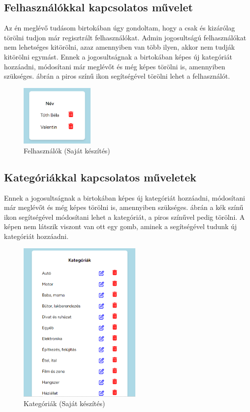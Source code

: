 \documentclass[]{thesis-ekf}
\theoremstyle{definition}
\theoremstyle{remark}
\begin{document}
	\subsection{Felhasználókkal kapcsolatos művelet}
	Az én meglévő tudásom birtokában úgy gondoltam, hogy a csak és kizárólag törölni tudjon már regisztrált felhasználókat. Admin jogosultságú felhasználókat nem lehetséges kitörölni, azaz amennyiben van több ilyen, akkor nem tudják kitörölni egymást. Ennek a jogosultságnak a birtokában képes új kategóriát hozzáadni, módosítani már meglévőt és még képes törölni is, amennyiben szükséges.  ábrán a piros színű ikon segítségével törölni lehet a felhasználót.
	\begin{figure}[ht!]
		\centering
		\includegraphics[height=3cm]{./felhasznaloi/felhasznalo}
		\caption{Felhasználók (Saját készítés)} 
		\label{felhasznalo-muvelet}
	\end{figure}
	\subsection{Kategóriákkal kapcsolatos műveletek}\label{sc-kategoria}
	Ennek a jogosultságnak a birtokában képes új kategóriát hozzáadni, módosítani már meglévőt és még képes törölni is, amennyiben szükséges.  ábrán a kék színű ikon segítségével módosítani lehet a kategóriát, a piros színűvel pedig törölni. A képen nem látszik viszont van ott egy gomb, aminek a segítségével tudunk új kategóriát hozzáadni.
	\begin{figure}[ht!]
		\centering
		\includegraphics[height=8cm]{./felhasznaloi/kategoria}
		\caption{Kategóriák (Saját készítés)} 
		\label{kategoria-muveletek}
	\end{figure} 
\end{document}
